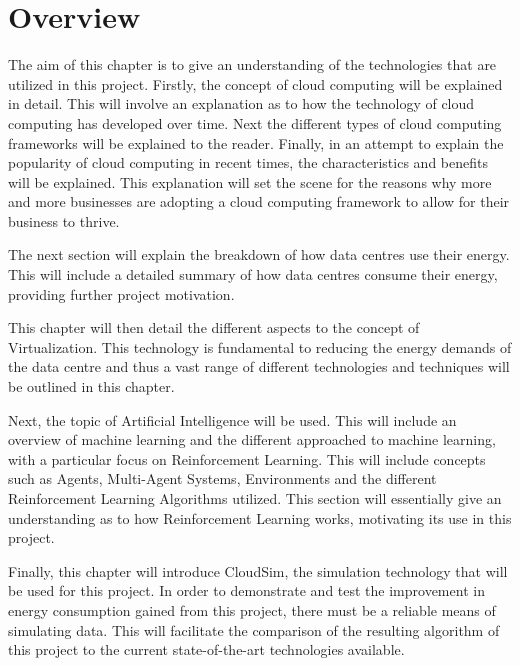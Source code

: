 \documentclass[oneside,12pt]{Classes/RoboticsLaTeX}
\begin{document}
\section{Overview}
The aim of this chapter is to give an understanding of the technologies that are utilized in this project. Firstly, the concept of cloud computing will be explained in detail. This will involve an explanation as to how the technology of cloud computing has developed over time. Next the different types of cloud computing frameworks will be explained to the reader. Finally, in an attempt to explain the popularity of cloud computing in recent times, the characteristics and benefits will be explained. This explanation will set the scene for the reasons why more and more businesses are adopting a cloud computing framework to allow for their business to thrive. 

The next section will explain the breakdown of how data centres use their energy. This will include a detailed summary of how data centres consume their energy, providing further project motivation.

This chapter will then detail the different aspects to the concept of Virtualization. This technology is fundamental to reducing the energy demands of the data centre and thus a vast range of different technologies and techniques will be outlined in this chapter. 

Next, the topic of Artificial Intelligence will be used. This will include an overview of machine learning and the different approached to machine learning, with a particular focus on Reinforcement Learning. This will include concepts such as Agents, Multi-Agent Systems, Environments and the different Reinforcement Learning Algorithms utilized. This section will essentially give an understanding as to how Reinforcement Learning works, motivating its use in this project.

Finally, this chapter will introduce CloudSim, the simulation technology that will be used for this project. In order to demonstrate and test the improvement in energy consumption gained from this project, there must be a reliable means of simulating data. This will facilitate the comparison of the resulting algorithm of this project to the current state-of-the-art technologies available. 
\end{document}
